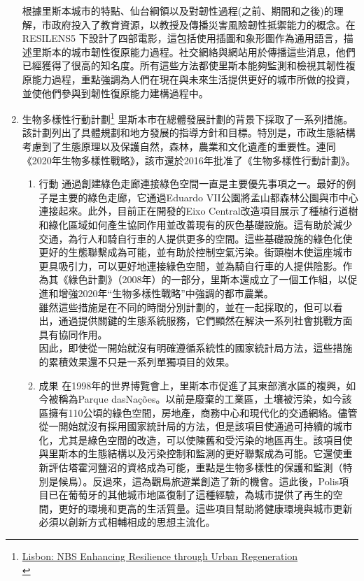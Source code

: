 \documentclass[a4paper,12pt]{article}
\begin{document}
\begin{enumerate}
根據里斯本城市的特點、仙台綱領以及對韌性過程(之前、期間和之後)的理解，市政府投入了教育資源，以教授及傳播災害風險韌性抵禦能力的概念。在 RESILENS5 下設計了四部電影，這包括使用插圖和象形圖作為通用語言，描述里斯本的城市韌性復原能力過程。社交網絡與網站用於傳播這些消息，他們已經獲得了很高的知名度。所有這些方法都使里斯本能夠監測和檢視其韌性複原能力過程，重點強調為人們在現在與未來生活提供更好的城市所做的投資，並使他們參與到韌性復原能力建構過程中。\\
\item 生物多樣性行動計劃\footnote{\href{https://oppla.eu/casestudy/19462}{Lisbon: NBS Enhancing Resilience through Urban Regeneration}\\}
\label{sec:org5c6e159}
里斯本市在總體發展計劃的背景下採取了一系列措施。該計劃列出了具體規劃和地方發展的指導方針和目標。特別是，市政生態結構考慮到了生態原理以及保護自然，森林，農業和文化遺產的重要性。連同《2020年生物多樣性戰略》，該市還於2016年批准了《生物多樣性行動計劃》。\\
\begin{enumerate}
\item 行動
\label{sec:org6192bd2}
通過創建綠色走廊連接綠色空間一直是主要優先事項之一。最好的例子是主要的綠色走廊，它通過Eduardo VII公園將孟山都森林公園與市中心連接起來。此外，目前正在開發的Eixo Central改造項目展示了種植行道樹和綠化區域如何產生協同作用並改善現有的灰色基礎設施。這有助於減少交通，為行人和騎自行車的人提供更多的空間。這些基礎設施的綠色化使更好的生態聯繫成為可能，並有助於控制空氣污染。街頭樹木使這座城市更具吸引力，可以更好地連接綠色空間，並為騎自行車的人提供陰影。作為其《綠色計劃》（2008年）的一部分，里斯本還成立了一個工作組，以促進和增強2020年“生物多樣性戰略”中強調的都市農業。\\

雖然這些措施是在不同的時間分別計劃的，並在一起採取的，但可以看出，通過提供關鍵的生態系統服務，它們顯然在解決一系列社會挑戰方面具有協同作用。\\

因此，即使從一開始就沒有明確遵循系統性的國家統計局方法，這些措施的累積效果還不只是一系列單獨項目的效果。\\
\item 成果
\label{sec:org88cd840}
在1998年的世界博覽會上，里斯本市促進了其東部濱水區的複興，如今被稱為Parque dasNações。以前是廢棄的工業區，土壤被污染，如今該區擁有110公頃的綠色空間，房地產，商務中心和現代化的交通網絡。儘管從一開始就沒有採用國家統計局的方法，但是該項目使通過可持續的城市化，尤其是綠色空間的改造，可以使陳舊和受污染的地區再生。該項目使與里斯本的生態結構以及污染控制和監測的更好聯繫成為可能。它還使重新評估塔霍河鹽沼的資格成為可能，重點是生物多樣性的保護和監測（特別是候鳥）。反過來，這為觀鳥旅遊業創造了新的機會。這此後，Polis項目已在葡萄牙的其他城市地區復制了這種經驗，為城市提供了再生的空間，更好的環境和更高的生活質量。這些項目幫助將健康環境與城市更新必須以創新方式相輔相成的思想主流化。\\


\end{enumerate}
\end{enumerate}
\end{document}
